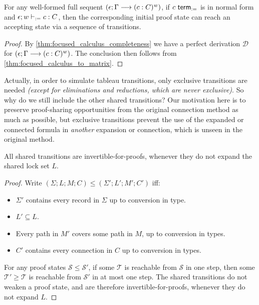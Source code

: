 \documentclass[twoside]{report}
\begin{document}
\begin{proposition}[Completeness]
    \label{thm:matrix_completeness}
    For any well-formed full sequent $(\epsilon; \Gamma \longrightarrow (c : C)^w)$, if $c \ \mathsf{term}_{:=}$ is in normal form and $\epsilon; w \vdash_{:=} c : C$, then the corresponding initial proof state can reach an accepting state via a sequence of transitions.
\end{proposition}

\begin{proof}
    By \cref{thm:focused_calculus_completeness} we have a perfect derivation $\mathcal D$ for $(\epsilon; \Gamma \longrightarrow (c : C)^w)$. The conclusion then follows from \cref{thm:focused_calculus_to_matrix}.
\end{proof}

Actually, in order to simulate tableau transitions, only exclusive transitions are needed \emph{(except for eliminations and reductions, which are never exclusive)}. So why do we still include the other shared transitions? Our motivation here is to preserve proof-sharing opportunities from the original connection method \cite{wallen1987automated} as much as possible, but exclusive transitions prevent the use of the expanded or connected formula in \emph{another} expansion or connection, which is unseen in the original method.

\begin{proposition}
    \label{thm:matrix_transitions_invertibility}
    All shared transitions are invertible-for-proofs, whenever they do not expand the shared lock set $L$.
\end{proposition}

\begin{proof}
    Write $(\Sigma; L; M; C) \leq (\Sigma'; L'; M'; C')$ iff:
    \begin{itemize}[noitemsep]
        \item $\Sigma'$ contains every record in $\Sigma$ up to conversion in type.
        \item $L' \subseteq L$.
        \item Every path in $M'$ covers some path in $M$, up to conversion in types.
        \item $C'$ contains every connection in $C$ up to conversion in types.
    \end{itemize}

    For any proof states $\mathcal S \leq \mathcal S'$, if some $\mathcal T$ is reachable from $\mathcal S$ in one step, then some $\mathcal T' \geq \mathcal T$ is reachable from $\mathcal S'$ in at most one step. The shared transitions do not weaken a proof state, and are therefore invertible-for-proofs, whenever they do not expand $L$.
\end{proof}
\end{document}
